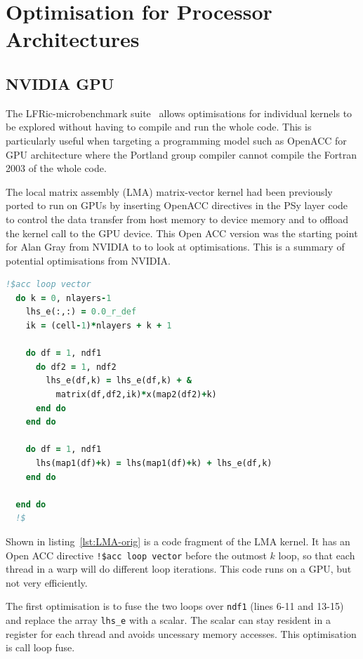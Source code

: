 \section{Optimisation for Processor Architectures
\label{sec:pa}}

\subsection{NVIDIA GPU}
The LFRic-microbenchmark suite~\cite{lfric-microbenchmarks} allows
optimisations for individual kernels to be explored without having to
compile and run the whole code. This is particularly useful when
targeting a programming model such as OpenACC for GPU architecture
where the Portland group compiler cannot compile the Fortran 2003 of
the whole code.

The local matrix assembly (LMA) matrix-vector kernel had been
previously ported to run on GPUs by inserting OpenACC directives in
the PSy layer code to control the data transfer from host memory to
device memory and to offload the kernel call to the GPU device. This
Open ACC version was the starting point for Alan Gray from NVIDIA to
to look at optimisations. This is a summary of potential optimisations
from NVIDIA.

\begin{lstlisting}[language=Fortran,caption={Code fragment of original 
    kernel},label={lst:LMA-orig}]
  !$acc loop vector 
  do k = 0, nlayers-1
    lhs_e(:,:) = 0.0_r_def
    ik = (cell-1)*nlayers + k + 1

    do df = 1, ndf1
      do df2 = 1, ndf2
        lhs_e(df,k) = lhs_e(df,k) + & 
          matrix(df,df2,ik)*x(map2(df2)+k)
      end do
    end do

    do df = 1, ndf1
      lhs(map1(df)+k) = lhs(map1(df)+k) + lhs_e(df,k)
    end do

  end do 
  !$
\end{lstlisting}

Shown in listing~\ref{lst:LMA-orig} is a code fragment of the LMA
kernel. It has an Open ACC directive \verb+!$acc loop vector+ before the
outmost $k$ loop, so that each thread in a warp will do different loop
iterations. This code runs on a GPU, but not very efficiently. 

The first optimisation is to fuse the two loops over \verb+ndf1+
(lines 6-11 and 13-15) and replace the array \verb+lhs_e+ with a
scalar. The scalar can stay resident in a register for each thread and
avoids uncessary memory accesses. This optimisation is call loop
fuse. 

